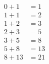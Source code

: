 \begin{align}
  0 +  1 &=  1 \\
  1 +  1 &=  2 \\
  1 +  2 &=  3 \\
  2 +  3 &=  5 \\
  3 +  5 &=  8 \\
  5 +  8 &= 13 \\
  8 + 13 &= 21
\end{align}
